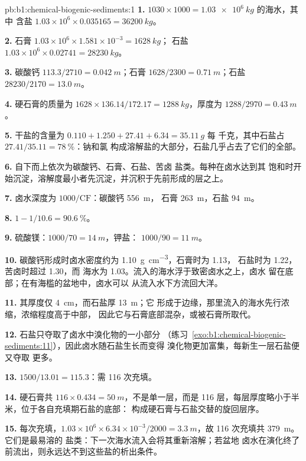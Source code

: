 \begin{solution}{pb:b1:chemical-biogenic-sediments:1}
\textbf{1.} $1030\times1000 = \qty{1.03e6}{kg}$ 的海水，其中
含盐 $1.03\times10^6\times0.035165 = \qty{36200}{kg}$。

\textbf{2.} 石膏 $1.03\times10^6\times1.581\times10^{-3} = \qty{1628}{kg}$；
石盐 $1.03\times10^6\times0.02741 = \qty{28230}{kg}$。

\textbf{3.} 碳酸钙 $113.3/2710 = \qty{0.042}{m}$；石膏 $1628/2300 =
\qty{0.71}{m}$；石盐 $28230/2170 = \qty{13.0}{m}$。

\textbf{4.} 硬石膏的质量为 $1628\times136.14/172.17 =
\qty{1288}{kg}$，厚度为 $1288/2970 = \qty{0.43}{m}$。

\textbf{5.} 干盐的含量为 $0.110 + 1.250 + 27.41 + 6.34 = \qty{35.11}{g}$ 每
千克，其中石盐占 $27.41/35.11 = \qty{78}{\%}$：钠和氯
构成溶解盐的大部分，石盐几乎占去了它们的全部。

\textbf{6.} 自下而上依次为碳酸钙、石膏、石盐、苦卤
盐类。每种在卤水达到其
饱和时开始沉淀，溶解度最小者先沉淀，并沉积于先前形成的层之上。

\textbf{7.} 卤水深度为 $1000/\mathrm{CF}$：碳酸钙 \qty{556}{m}，
石膏 \qty{263}{m}，石盐 \qty{94}{m}。

\textbf{8.} $1 - 1/10.6 = \qty{90.6}{\%}$。

\textbf{9.} 硫酸镁：$1000/70 = \qty{14}{m}$，钾盐：
$1000/90 = \qty{11}{m}$。

\textbf{10.} 碳酸钙形成时卤水密度约为 \qty{1.10}{g.cm^{-3}}，石膏时为 1.13，
石盐时为 1.22，苦卤时超过 1.30，而
海水为 1.03。流入的海水浮于致密卤水之上，卤水
留在底部；在有海槛的盆地中，卤水可以
从流入水下方流回大洋。

\textbf{11.} 其厚度仅 \qty{4}{cm}，而石盐厚 \qty{13}{m}；它
形成于边缘，那里流入的海水先行浓缩，浓缩程度高于中部，
因此它与石膏底部混杂，或被石膏所取代。

\textbf{12.} 石盐只夺取了卤水中溴化物的一小部分
（练习~\ref{exo:b1:chemical-biogenic-sediments:11}），因此卤水随石盐生长而变得
溴化物更加富集，每新生一层石盐便又夺取
更多。

\textbf{13.} $1500/13.01 = 115.3$：需 116 次充填。

\textbf{14.} 硬石膏共 $116\times0.434 = \qty{50}{m}$，不是单一层，而是
116 层，每层厚度略小于半米，位于各自充填期石盐的底部：
构成硬石膏与石盐交替的旋回层序。

\textbf{15.} 每次充填，$1.03\times10^6\times6.34\times10^{-3}/2000 =
\qty{3.3}{m}$，故 116 次充填共 \qty{379}{m}。它们是最易溶的
盐类：下一次海水流入会将其重新溶解；若盆地
卤水在演化终了前流出，则永远达不到这些盐的析出条件。


\end{solution}

